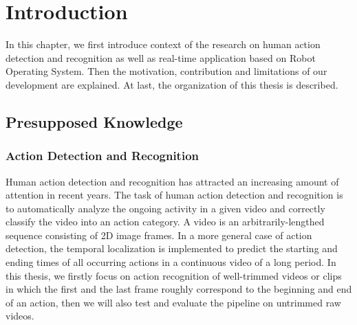 
\chapter{Introduction}
\label{sec:introduction}

In this chapter, we first introduce context of the research on human action detection and recognition as well as real-time application based on Robot Operating System. Then the motivation, contribution and limitations of our development are explained. At last, the organization of this thesis is described. 

\section{Presupposed Knowledge}
\subsection{Action Detection and Recognition}

Human action detection and recognition has attracted an increasing amount of attention in recent years.
The task of human action detection and recognition is to automatically analyze the ongoing activity in a given video and correctly classify the video into an action category. A video is an arbitrarily-lengthed sequence consisting of 2D image frames. In a more general case of action detection, the temporal localization is implemented to predict the starting and ending times of all occurring actions in a continuous video of a long period. In this thesis, we firstly focus on action recognition of well-trimmed videos or clips in which the first and the last frame roughly correspond to the beginning and end of an action, then we will also test and evaluate the pipeline on untrimmed raw videos. 

